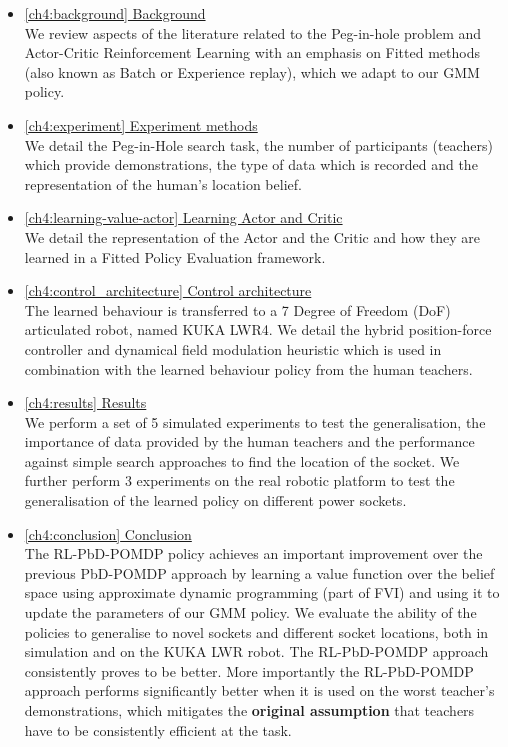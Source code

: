 \begin{itemize}
  \item \hyperref[ch4:background]{\ref{ch4:background}   Background}\\
  We review aspects of the literature related to the Peg-in-hole problem and Actor-Critic Reinforcement Learning 
  with an emphasis on Fitted methods (also known as Batch or Experience replay), which we adapt to our GMM policy.
  \item \hyperref[ch4:experiment]{\ref{ch4:experiment}   Experiment methods}\\
  We detail the Peg-in-Hole search task, the number of participants (teachers) which provide demonstrations, the 
  type of data which is recorded and the representation of the human's location belief.
  \item \hyperref[ch4:learning-value-actor]{\ref{ch4:learning-value-actor} Learning Actor and Critic}\\
  We detail the representation of the Actor and the Critic and how they are learned in a Fitted Policy Evaluation 
  framework.
  \item \hyperref[ch4:control_architecture]{\ref{ch4:control_architecture} Control architecture}\\
  The learned behaviour is transferred to a 7 Degree of Freedom (DoF) articulated robot, named KUKA LWR4. 
  We detail the hybrid position-force controller and dynamical field modulation heuristic which is used in 
  combination with the learned behaviour policy from the human teachers.
  \item \hyperref[ch4:results]{\ref{ch4:results}  	 Results}\\
  We perform a set of 5 simulated experiments to test the generalisation, the importance of data provided by the human 
  teachers and the performance against simple search approaches to find the location of the socket. We further perform 
  3 experiments on the real robotic platform to test the generalisation of the learned policy on different power sockets.
  \item \hyperref[ch4:conclusion]{\ref{ch4:conclusion} Conclusion}\\
  The RL-PbD-POMDP policy achieves an important improvement over the previous PbD-POMDP approach
   by learning a value function over the belief space using approximate dynamic programming (part of FVI) and using it 
   to update the parameters of our GMM policy. We evaluate the ability of the policies to generalise to novel sockets 
   and different socket locations, both in simulation and on the KUKA LWR robot.
   The RL-PbD-POMDP approach consistently proves to be better. More importantly the RL-PbD-POMDP approach performs 
   significantly better when it is used on the worst teacher's demonstrations, which mitigates the \textbf{original assumption} that 
   teachers have to be consistently efficient at the task.
\end{itemize}

